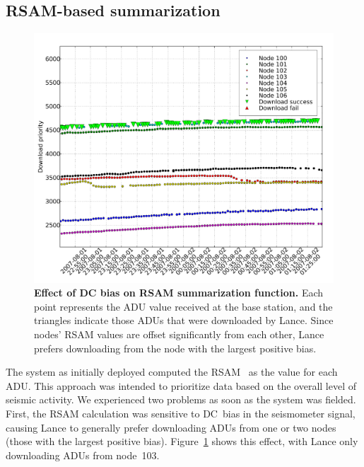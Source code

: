 
\pagebreak
\subsection{RSAM-based summarization}

\begin{figure}[t]
\label{lance-fig-rsam-dc-bias}
\begin{center}
\includegraphics[width=1.0\hsize]{./4-lance/figs/deploy/downloads-pre-median-filter5.pdf}
\end{center}
\caption{\textbf{Effect of DC bias on RSAM summarization function.}
Each point represents the ADU value received at the base station, and the
triangles indicate those ADUs that were downloaded by Lance. Since nodes'
RSAM values are offset significantly from each other, Lance prefers
downloading from the node with the largest positive bias.}
\end{figure}

The system as initially deployed computed the RSAM~\cite{rsam} as the
value for each ADU.
This approach was intended to prioritize data based on
the overall level of seismic activity. We experienced two problems as
soon as the system was fielded. First, the RSAM calculation was
sensitive to DC~bias in the seismometer signal, causing Lance to 
generally prefer downloading ADUs from one or two nodes (those with
the largest positive bias). Figure~\ref{lance-fig-rsam-dc-bias} shows this
effect, with Lance only downloading ADUs from node~103.


